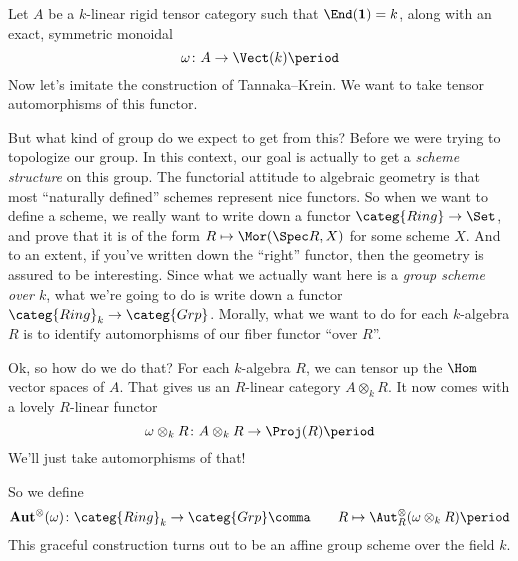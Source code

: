\documentclass[leqno]{article}
\begin{document}
Let \(A\) be a \(k\)-linear rigid tensor category
such that \(\End(\mathbf{1}) = k\), along with
an exact, symmetric monoidal 
\begin{equation*}
    \omega \colon A \to \Vect(k) \period
\end{equation*}
Now let's imitate the construction of Tannaka--Krein.
We want to take tensor automorphisms of this functor.

But what kind of group do we expect to get from this?
Before we were trying to topologize our group.
In this context, our goal is actually
to get a \emph{scheme structure} on this group.
The functorial attitude to algebraic geometry is that
most \enquote{naturally defined} schemes represent nice functors.
So when we want to define a scheme, we really want
to write down a functor \(\categ{Ring} \to \Set\),
and prove that it is of the form \(R \mapsto \Mor(\Spec R, X)\)
for some scheme \(X\).
And to an extent, if you've written down the \enquote{right} functor,
then the geometry is assured to be interesting.
Since what we actually want here is a \emph{group scheme over \(k\)},
what we're going to do is write down a functor
\(\categ{Ring}_k \to \categ{Grp}\).
Morally, what we want to do for each \(k\)-algebra \(R\) is
to identify automorphisms of our fiber functor \enquote{over \(R\)}.

Ok, so how do we do that?
For each \(k\)-algebra \(R\),
we can tensor up the \(\Hom\) vector spaces of \(A\).
That gives us an \(R\)-linear category \(A \otimes_k R\).
It now comes with a lovely \(R\)-linear functor
\begin{equation*}
    \omega \otimes_k R \colon A \otimes_k R \to \Proj(R) \period
\end{equation*}
We'll just take automorphisms of that!

So we define
\begin{equation*}
    \mathbf{Aut}^{\otimes}(\omega) \colon
    \categ{Ring}_k \to \categ{Grp} \comma \qquad
    R \mapsto \Aut_R^{\otimes}(\omega \otimes_k R) \period
\end{equation*}
This graceful construction turns out to be an affine group scheme
over the field \(k\).
\end{document}
